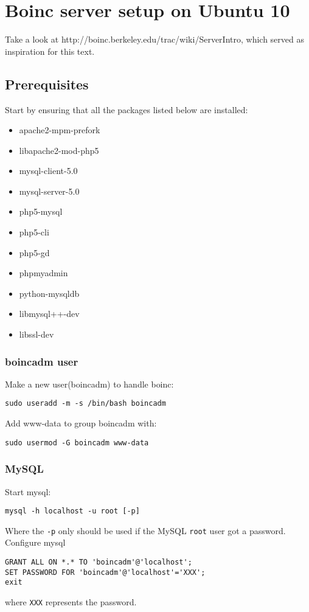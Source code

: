 \documentclass{article}
\begin{document}
\section{Boinc server setup on Ubuntu 10}
Take a look at http://boinc.berkeley.edu/trac/wiki/ServerIntro, which served as inspiration for this text.
%
\subsection{Prerequisites}
Start by ensuring that all the packages listed below are installed:
\begin{itemize}
\item apache2-mpm-prefork
\item libapache2-mod-php5
\item mysql-client-5.0
\item mysql-server-5.0
\item php5-mysql
\item php5-cli
\item php5-gd
\item phpmyadmin
\item python-mysqldb
\item libmysql++-dev
\item libssl-dev
\end{itemize}
%
\subsubsection{boincadm user}
Make a new user(boincadm) to handle boinc:
\begin{verbatim}	
sudo useradd -m -s /bin/bash boincadm
\end{verbatim}
%
Add www-data to group boincadm with:
\begin{verbatim}
sudo usermod -G boincadm www-data
\end{verbatim}
%
\subsubsection{MySQL}
Start mysql:
\begin{verbatim}
mysql -h localhost -u root [-p] 
\end{verbatim}
Where the \texttt{-p} only should be used if the MySQL \texttt{root} user got a password.
%
Configure mysql
\begin{verbatim}
GRANT ALL ON *.* TO 'boincadm'@'localhost';
SET PASSWORD FOR 'boincadm'@'localhost'='XXX'; 
exit 
\end{verbatim}
%
where \texttt{XXX} represents the password.
%
\end{document}
